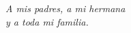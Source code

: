 
\thispagestyle{empty}
{}

\hfill
\vfill

\begin{flushright}
\emph{A mis padres, a mi hermana \\ y a toda mi familia.} \\
\end{flushright}

\vfill

\clearpage

\endinput
